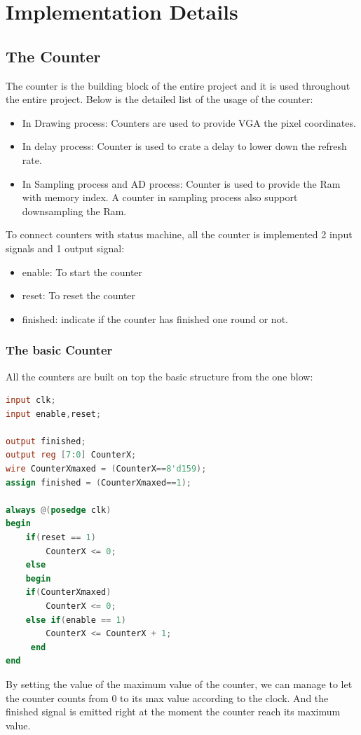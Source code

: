 \documentclass[11pt]{scrartcl}
\begin{document}
\section{Implementation Details}
\subsection{The Counter}
The counter is the building block of the entire project and it is used throughout the entire project. Below is the detailed list of the usage of the counter:
\begin{itemize}
    \item In Drawing process:
     Counters are used to provide VGA the pixel coordinates.
     \item In delay process:
     Counter is used to crate a delay to lower down the refresh rate.
     \item In Sampling process and AD process:
    Counter is used to provide the Ram with memory index. A counter in sampling process also support downsampling the Ram.
\end{itemize}

To connect counters with status machine, all the counter is implemented 2 input signals and 1 output signal:
\begin{itemize}
    \item enable: To start the counter
    \item reset: To reset the counter
    \item finished: indicate if the counter has finished one round or not.
\end{itemize}
\subsubsection{The basic Counter}
All the counters are built on top the basic structure from the one blow:

\begin{lstlisting}[language=Verilog]
input clk;
input enable,reset;

output finished;
output reg [7:0] CounterX;
wire CounterXmaxed = (CounterX==8'd159); 
assign finished = (CounterXmaxed==1);

always @(posedge clk)
begin
	if(reset == 1)
		CounterX <= 0;
	else
	begin
	if(CounterXmaxed)
	  	CounterX <= 0;
	else if(enable == 1)
	  	CounterX <= CounterX + 1;
	 end
end
\end{lstlisting}

By setting the value of the maximum value of the counter, we can manage to let the counter counts from 0 to its max value according to the clock. And the finished signal is emitted right at the moment the counter reach its maximum value.
\end{document}
